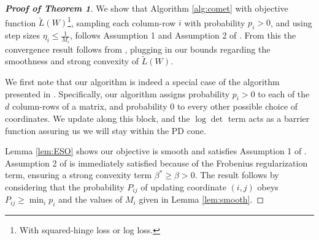 \documentclass{article} %
\newcommand\mat[1]{{#1}}
\newcommand{\W}{\mat{W}}
\newcommand{\Pp}{\mat{P}}
\newcommand{\tL}{\tilde{L}(\W)}
\newcommand{\ignore}[1]{}
\newtheorem{apptheorem}{Theorem}
\begin{document}
\ignore{
\begin{apptheorem}
Let $\W^t$ be the $t$-th iterate of Algorithm \ref{alg:comet} with objective function $\tL$, sampling each column-row $i$ with probability $p_i >0$ and using step sizes $\eta_i \leq \frac{1}{M_i}$. Let $\tilde{L}^*$ be the optimal value of $\tL$ on the PSD cone. Let $\beta^* \geq \beta$ be the strong convexity parameter of $\tL$, $M^1 = \max_i M^1_i$, and $\rho >0, \epsilon>0$.

If $t > \frac{d M^1 + \alpha (d/\kappa)^2 + d\beta}{\beta^*} log \left( \frac{\tilde{L}(W^0) - \tilde{L}^*}{\epsilon \rho}\right)$ then: $$Prob(\tilde{L}(\W^k) - \tilde{L}^* \leq \epsilon) \geq 1-\rho.$$
\end{apptheorem}}
\begin{proof}[\bf{Proof of Theorem 1}]
We show that Algorithm \ref{alg:comet} with objective function $\tL$\footnote{With squared-hinge loss or log loss.}, sampling each column-row $i$ with probability $p_i >0$, and using step sizes $\eta_i \leq \frac{1}{M_i}$, follows Assumption 1 and Assumption 2 of \citet{richtarik2013optimal}. From this the convergence result follows from \citeauthor[Theorem 3]{richtarik2013optimal}, plugging in our bounds regarding the smoothness and strong convexity of $\tL$.

We first note that our algorithm is indeed a special case of the algorithm presented in \citet{richtarik2013optimal}. Specifically, our algorithm assigns probability $p_i > 0 $ to each of the $d$ column-rows of a matrix, and probability $0$ to every other possible choice of coordinates. We update along this block, and the $\log \det$ term acts as a barrier function
assuring us we will stay within the PD cone.

Lemma \ref{lem:ESO} shows our objective is smooth and satisfies Assumption 1 of \citeauthor{richtarik2013optimal}. Assumption 2 of \citeauthor{richtarik2013optimal} is immediately satisfied because of the Frobenius regularization term, ensuring a strong convexity term $\beta^* \geq \beta > 0$. The result follows by considering that the probability $\Pp_{ij}$ of updating coordinate $(i,j)$ obeys $\Pp_{ij} \geq \min_i p_i $ and the values of $M_i$ given in Lemma \ref{lem:smooth}.

\end{proof}

\newpage

\small{

%
}
\end{document}
